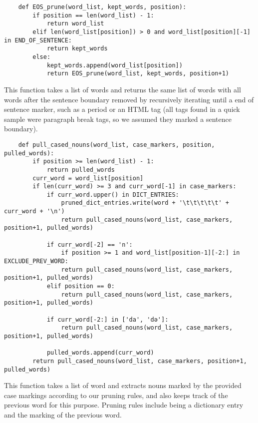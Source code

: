 \documentclass{article}      %
\begin{document}
	\begin{verbatim}
	def EOS_prune(word_list, kept_words, position):
		if position == len(word_list) - 1:
			return word_list
		elif len(word_list[position]) > 0 and word_list[position][-1] in END_OF_SENTENCE:
			return kept_words
		else:
			kept_words.append(word_list[position])
			return EOS_prune(word_list, kept_words, position+1)
	\end{verbatim}
	
	This function takes a list of words and returns the same list of words with all words after the sentence boundary removed by recursively iterating until a end of sentence marker, such as a period or an HTML tag (all tags found in a quick sample were paragraph break tags, so we assumed they marked a sentence boundary).
	
	\begin{verbatim}
	def pull_cased_nouns(word_list, case_markers, position, pulled_words):
		if position >= len(word_list) - 1:
			return pulled_words
		curr_word = word_list[position]
		if len(curr_word) >= 3 and curr_word[-1] in case_markers:
			if curr_word.upper() in DICT_ENTRIES:
				pruned_dict_entries.write(word + '\t\t\t\t\t' + curr_word + '\n')
				return pull_cased_nouns(word_list, case_markers, position+1, pulled_words)
			
			if curr_word[-2] == 'n':
				if position >= 1 and word_list[position-1][-2:] in EXCLUDE_PREV_WORD:
				return pull_cased_nouns(word_list, case_markers, position+1, pulled_words)
			elif position == 0:
				return pull_cased_nouns(word_list, case_markers, position+1, pulled_words)
			
			if curr_word[-2:] in ['da', 'də']:
				return pull_cased_nouns(word_list, case_markers, position+1, pulled_words)
			
			pulled_words.append(curr_word)
		return pull_cased_nouns(word_list, case_markers, position+1, pulled_words)
	\end{verbatim}
	
	This function takes a list of word and extracts nouns marked by the provided case markings according to our pruning rules, and also keeps track of the previous word for this purpose. Pruning rules include being a dictionary entry and the marking of the previous word.
	
\end{document}
